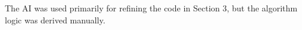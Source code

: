 







\begin{AIDcomment}
The AI was used primarily for refining the code in Section 3, but the algorithm logic was derived manually.
\end{AIDcomment}

